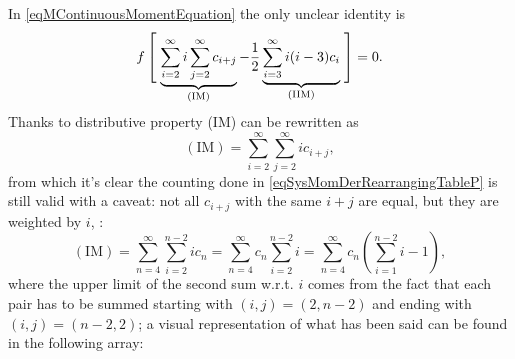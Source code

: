                \hfill\blacksquare

                In \eqref{eqMContinuousMomentEquation} the only unclear identity is
                \begin{equation}
                    f\left[\vphantom{\sum_{i,j=2}^\infty}\right.%
                    \underbrace{\sum_{i=2}^\infty i\sum_{j=2}^\infty c_{i+j}}_{(\text{IM})}
                    -\frac12\underbrace{\sum_{i=3}^\infty i(i-3)c_i}_{(\text{IIM})}
                    \left.\vphantom{\sum_{i,j=2}^\infty}\right]=0.
                    \label{eqSysMomDerUnclearIdentityM}
                \end{equation}
                Thanks to distributive property (IM) can be rewritten as
                $$
                    (\text{IM})=\sum_{i=2}^\infty\sum_{j=2}^\infty  ic_{i+j},
                $$
                from which it's clear the counting done in \eqref{eqSysMomDerRearrangingTableP} is still valid with a caveat: not all $c_{i+j}$ with the same $i+j$ are equal, but they are weighted by $i$, \ie{}:
                $$
                (\text{IM})=
                \sum_{n=4}^\infty\sum_{i=2}^{n-2}  ic_n=
                \sum_{n=4}^\infty c_n\sum_{i=2}^{n-2}i=
                \sum_{n=4}^\infty c_n\left(\sum_{i=1}^{n-2}i-1\right),
                $$
                where the upper limit of the second sum w.r.t. $i$ comes from the fact that each pair has to be summed starting with $(i,j)=(2,n-2)$ and ending with $(i,j)=(n-2,2)$; a visual representation of what has been said can be found in the following array:
                \renewcommand\lineOverlap[5]{
                    \pgfmathsetmacro\wBase{.3} %
                    \pgfmathsetmacro\riNWC{#1+\wBase} %
                    \pgfmathsetmacro\riSWC{#1+\wBase} %
                    \pgfmathsetmacro\riSEC{#3-\wBase} %
                    \pgfmathsetmacro\riNEC{#3-\wBase} %
                    \pgfmathsetmacro\ciNWC{#2-\wBase} %
                    \pgfmathsetmacro\ciSWC{#2+\wBase} %
                    \pgfmathsetmacro\ciSEC{#4+\wBase} %
                    \pgfmathsetmacro\ciNEC{#4-\wBase} %
                    \tikz\fill[%
                        overlay,
                        remember picture,
                        #5,
                        fill opacity=0.5,
                        rounded corners=7pt,
                    ]%
                        (\riNWC-|\ciNWC) -- 
                        (\riSWC-|\ciSWC) -- 
                        (\riSEC-|\ciSEC) -- 
                        (\riNEC-|\ciNEC) -- cycle;
                }
